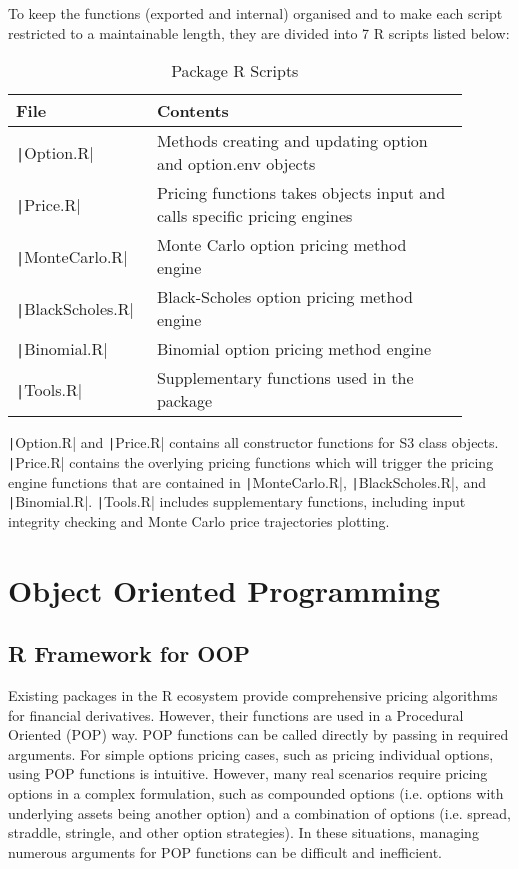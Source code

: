 To keep the functions (exported and internal) organised and to make each script restricted to a maintainable length, they are divided into 7 R scripts listed below:

\begin{table}[H]
\begin{tabular}{p{0.25\linewidth} | p{0.65\linewidth}}
File                           & Contents \\ \hline
\texttt|Option.R|       & Methods creating and updating option and option.env objects \\
\texttt|Price.R|        & Pricing functions takes objects input and calls specific pricing engines \\
\texttt|MonteCarlo.R|   & Monte Carlo option pricing method engine \\
\texttt|BlackScholes.R| & Black-Scholes option pricing method engine \\
\texttt|Binomial.R|     & Binomial option pricing method engine \\
\texttt|Tools.R|        & Supplementary functions used in the package
\end{tabular}
\caption{Package R Scripts} \label{tab:pkg_scripts}
\end{table} 

\texttt|Option.R| and \texttt|Price.R| contains all constructor functions for S3 class objects. \texttt|Price.R| contains the overlying pricing functions which will trigger the pricing engine functions that are contained in \texttt|MonteCarlo.R|, \texttt|BlackScholes.R|, and \texttt|Binomial.R|. \texttt|Tools.R| includes supplementary functions, including input integrity checking and Monte Carlo price trajectories plotting.

\section{Object Oriented Programming}

\subsection{R Framework for OOP}

Existing packages in the R ecosystem provide comprehensive pricing algorithms for financial derivatives. However, their functions are used in a Procedural Oriented (POP) way. POP functions can be called directly by passing in required arguments. For simple options pricing cases, such as pricing individual options, using POP functions is intuitive. However, many real scenarios require pricing options in a complex formulation, such as compounded options (i.e. options with underlying assets being another option) and a combination of options (i.e. spread, straddle, stringle, and other option strategies). In these situations, managing numerous arguments for POP functions can be difficult and inefficient.

